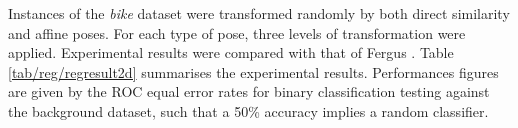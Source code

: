 Instances of the \emph{bike} dataset were transformed randomly by both direct similarity and affine poses. For each type of pose, three levels of transformation were applied. Experimental results were compared with that of Fergus \etal \cite{Fergus2007}.   
Table \ref{tab/reg/regresult2d} summarises the experimental results. 
Performances figures are given by the ROC equal error rates for binary classification testing against the background dataset, such that a 50\% accuracy implies a random classifier. 

